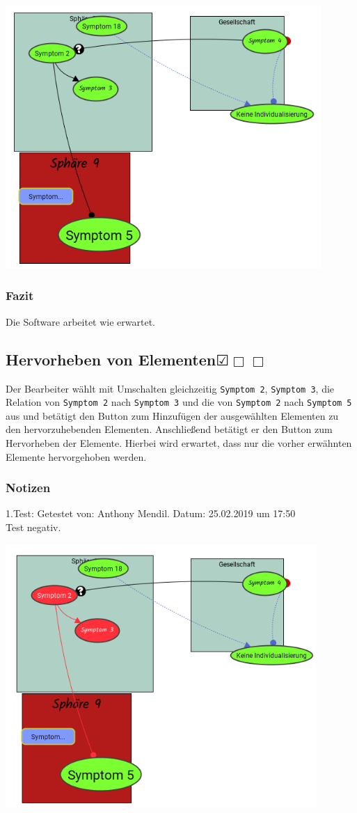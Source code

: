 \documentclass{scrartcl}
\newcommand{\subsectiont}[2]{\subsection[#1]{#1{\normalsize\normalfont #2}}}
\newcommand{\leer}{$\Box$}
\newcommand{\ok}{$\CheckedBox$}
\begin{document}
\begin{center}
\includegraphics[height=10cm]{3_55eingeblendet.PNG}
\end{center}
\subsubsection{Fazit}
Die Software arbeitet wie erwartet.

\subsectiont{Hervorheben von Elementen}{\dotfill\ok\leer\leer}
Der Bearbeiter wählt mit Umschalten gleichzeitig \texttt{Symptom 2}, \texttt{Symptom 3}, die Relation von \texttt{Symptom 2} nach \texttt{Symptom 3} und die von \texttt{Symptom 2} nach \texttt{Symptom 5} aus und betätigt den Button zum Hinzufügen der ausgewählten Elementen zu den hervorzuhebenden Elementen.  Anschließend betätigt er den Button zum Hervorheben der Elemente. Hierbei wird erwartet, dass nur die vorher erwähnten Elemente hervorgehoben werden. 
\subsubsection{Notizen}
1.Test: Getestet von: Anthony Mendil. Datum: 25.02.2019 um 17:50 \\
Test negativ. 
\begin{center}
\includegraphics[height=10cm]{3_56.PNG}
\end{center}
\end{document}
